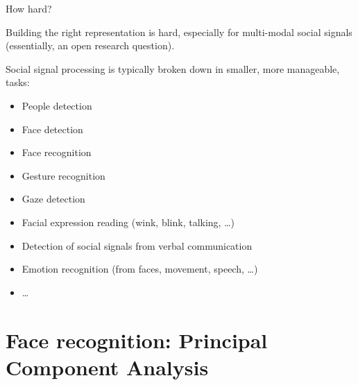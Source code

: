 \documentclass[compress]{beamer}
\begin{document}
\begin{frame}{How hard?}

    Building the right representation is hard, especially for multi-modal social
    signals (essentially, an open research
    question).

    \pause

Social signal processing is typically broken down in smaller, more manageable,
    tasks:

\begin{itemize}

\item People detection
\item Face detection
\item Face recognition
\item Gesture recognition
\item Gaze detection
\item Facial expression reading (wink, blink, talking, \ldots{})
\item Detection of social signals from verbal communication
\item Emotion recognition (from faces, movement, speech, \ldots{})
\item \ldots{}
\end{itemize}

\end{frame}


\section[Principal Component Analysis]{Face recognition: Principal Component Analysis}

\end{document}
